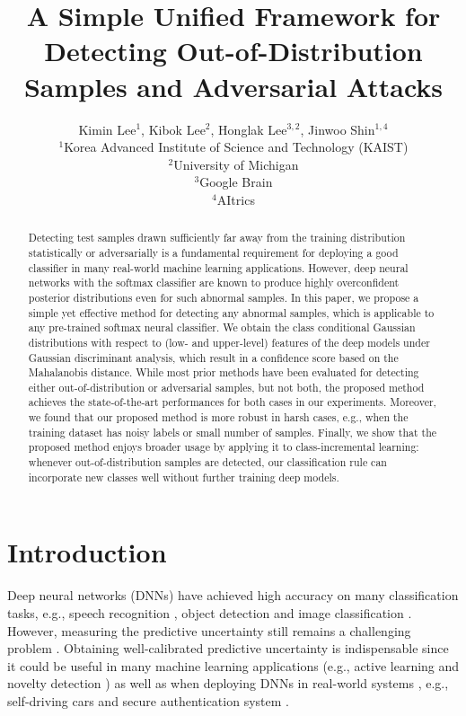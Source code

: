 \documentclass{article}
\title{A Simple Unified Framework for Detecting Out-of-Distribution Samples and Adversarial Attacks}
\author{
Kimin Lee$^{1}$, Kibok Lee$^{2}$, Honglak Lee$^{3,2}$, Jinwoo Shin$^{1,4}$\\
$^{1}$Korea Advanced Institute of Science and Technology (KAIST)\\
$^{2}$University of Michigan\\
$^{3}$Google Brain\\
$^{4}$AItrics\\
}
\begin{document}
\maketitle

\begin{abstract}
Detecting test samples drawn sufficiently far away from the training distribution statistically
or adversarially is a fundamental requirement for deploying a good classifier in many real-world machine learning applications. 
However, deep neural networks with the softmax classifier are known to produce highly overconfident posterior distributions even for such abnormal samples.
In this paper, we propose a simple yet effective method for detecting
any abnormal samples, which is applicable to any pre-trained softmax neural classifier. We obtain the class conditional Gaussian distributions with respect to (low- and upper-level) features of the deep models under Gaussian discriminant analysis, which result in a confidence score based on the Mahalanobis distance.
While most prior methods have been evaluated for detecting either out-of-distribution or adversarial samples, but not both,
the proposed method achieves the state-of-the-art performances for both cases 
in our experiments.
Moreover, we found that our proposed method is more robust in harsh cases, e.g., when the training dataset has noisy labels or small number of samples.
Finally, we show that the proposed method enjoys broader usage by applying it to class-incremental learning:
whenever out-of-distribution samples are detected, our classification rule can incorporate new classes well without further training deep models.
\end{abstract}

\section{Introduction} \label{sec:intro}


Deep neural networks (DNNs) have achieved high accuracy on many classification tasks, 
e.g., speech recognition \citep{amodei2016deep}, object detection \citep{girshick2015fast} and image classification \citep{he2016deep}.
However, measuring the predictive uncertainty still remains a challenging problem \citep{lee2017training,liang2017principled}.
Obtaining well-calibrated predictive uncertainty is indispensable since it could be useful in many machine learning applications (e.g., active learning \citep{gal2017deep} and novelty detection \citep{lee2018hierarchical}) as well as when deploying DNNs in real-world systems \citep{amodei2016concrete}, e.g., self-driving cars and secure authentication system \citep{evtimov2017robust,sharif2016accessorize}.
\end{document}

